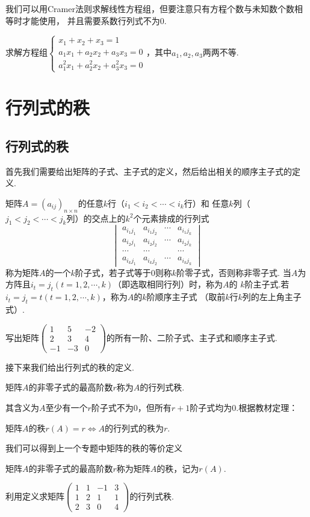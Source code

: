 我们可以用Cramer法则求解线性方程组，但要注意只有方程个数与未知数个数相等时才能使用，
并且需要系数行列式不为0.
\begin{example}
	求解方程组$\begin{cases}
		x_1+x_2+x_3=1 \\
		a_1x_1+a_2x_2+a_3x_3=0 \\
		a_1^2x_1+a_2^2x_2+a_3^2x_3=0
	\end{cases}$，其中$a_1,a_2,a_3$两两不等.
\end{example}

\section{行列式的秩}
\subsection{行列式的秩}
首先我们需要给出矩阵的子式、主子式的定义，然后给出相关的顺序主子式的定义.
\begin{definition}
	矩阵$A=(a_{ij})_{n \times n}$的任意$k$行（$i_1<i_2<\cdots<i_k$行）和
	任意$k$列（$j_1<j_2<\cdots<j_k$列）的交点上的$k^2$个元素排成的行列式
	$$\begin{vmatrix}
		a_{i_1j_1} & a_{i_1j_2} & \cdots & a_{i_1j_k} \\
		a_{i_2j_1} & a_{i_2j_2} & \cdots & a_{i_2j_k} \\
		\cdots & \cdots &  & \cdots \\
		a_{i_kj_1} & a_{i_kj_2} & \cdots & a_{i_kj_k}
	\end{vmatrix}$$
	称为矩阵$A$的一个$k$阶子式，若子式等于$0$则称$k$阶零子式，否则称非零子式.
	当$A$为方阵且$i_t=j_t(t=1,2,\cdots,k)$（即选取相同行列）时，称为$A$的
	$k$阶主子式.若$i_t=j_t=t(t=1,2,\cdots,k)$，称为$A$的$k$阶顺序主子式
	（取前$k$行$k$列的左上角主子式）.
\end{definition}
\begin{example}
	写出矩阵$\begin{pmatrix}
		1 & 5 & -2 \\ 2 & 3 & 4 \\ -1 & -3 & 0
	\end{pmatrix}$的所有一阶、二阶子式、主子式和顺序主子式.
\end{example}
接下来我们给出行列式的秩的定义.
\begin{definition}
	矩阵$A$的非零子式的最高阶数$r$称为$A$的行列式秩.
\end{definition}
\raggedright 其含义为$A$至少有一个$r$阶子式不为0，但所有$r+1$阶子式均为0.根据教材定理：
\begin{theorem}
	矩阵$A$的秩$r(A)=r \iff A$的行列式的秩为$r$.
\end{theorem}
\raggedright 我们可以得到上一个专题中矩阵的秩的等价定义
\begin{definition}
	矩阵$A$的非零子式的最高阶数$r$称为矩阵$A$的秩，记为$r(A)$.
\end{definition}
\begin{example}
	利用定义求矩阵$\begin{pmatrix}
		1 & 1 & -1 & 3 \\ 1 & 2 & 1 & 1 \\ 2 & 3 & 0 & 4
	\end{pmatrix}$的行列式秩.
\end{example}
